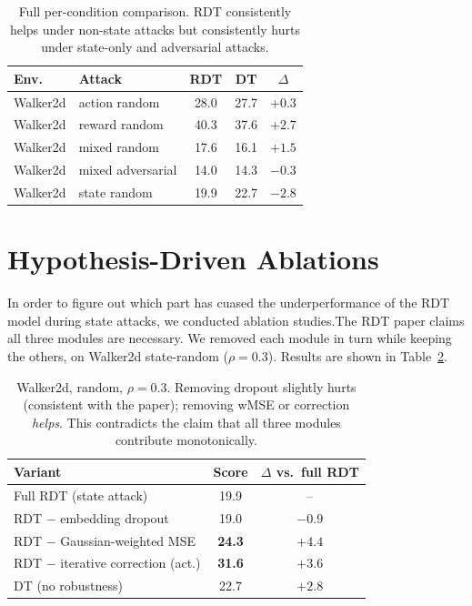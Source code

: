 \documentclass[10pt,twocolumn,letterpaper]{article}
\begin{document}
\begin{table}[t]
\centering
\small
\setlength{\tabcolsep}{3pt}
\begin{tabular}{llccc}
\toprule
\textbf{Env.} & \textbf{Attack} & \textbf{RDT} & \textbf{DT} & \textbf{$\Delta$} \\
\midrule
Walker2d & action random                  & 28.0 & 27.7 & $+0.3$ \\
Walker2d & reward random                  & 40.3 & 37.6 & $+2.7$ \\
Walker2d & mixed random                   & 17.6 & 16.1 & $+1.5$ \\
Walker2d & mixed adversarial              & 14.0 & 14.3 & $-0.3$ \\
Walker2d & state random                   & 19.9 & 22.7 & $-2.8$ \\

\bottomrule
\end{tabular}
\caption{Full per-condition comparison. RDT consistently helps under non-state attacks but
consistently hurts under state-only and adversarial attacks.}
\label{tab:fullresults}
\end{table}

\section{Hypothesis-Driven Ablations}
\label{sec:ablations}

In order to figure out which part has cuased the underperformance of the RDT model during state attacks, we conducted ablation studies.The RDT paper claims all three modules are necessary. We removed each
module in turn while keeping the others, on Walker2d state-random
($\rho=0.3$). Results are shown in Table~\ref{tab:ablation}.

\begin{table}[h]
\centering
\small
\setlength{\tabcolsep}{4pt}
\begin{tabular}{lcc}
\toprule
\textbf{Variant} & \textbf{Score} & \textbf{$\Delta$ vs.\ full RDT} \\
\midrule
Full RDT (state attack)             & 19.9 & --     \\
RDT $-$ embedding dropout           & 19.0 & $-0.9$ \\
RDT $-$ Gaussian-weighted MSE       & \textbf{24.3} & $+4.4$ \\
RDT $-$ iterative correction (act.) & \textbf{31.6} & $+3.6$ \\
DT (no robustness)                  & 22.7 & $+2.8$ \\
\bottomrule
\end{tabular}
\caption{Walker2d, random, $\rho=0.3$. Removing dropout slightly hurts
(consistent with the paper); removing wMSE or correction \emph{helps}.
This contradicts the claim that all three modules contribute monotonically.}
\label{tab:ablation}
\end{table}
\end{document}
